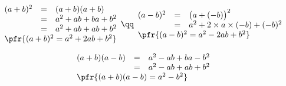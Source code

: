 \documentclass[10pt,openright,twoside,french]{book}
\begin{document}
\begin{Demo}
    \[\begin{array}[c]{rcl}
        (a + b)^2 & = & (a + b)(a + b) \\
                         & = & a^2 + ab + ba + b^2\\
                         & = & a^2 + ab + ab + b^2 \\
        \multicolumn{3}{l}{\pfr{(a + b)^2 = a^2 + 2ab + b^2}}
    \end{array} \qq
    \begin{array}[c]{rcl}
        (a - b)^2 & = & \big(a + (- b)\big)^2 \\
                        & = & a^2 + 2 \times a \times (-b) + (-b)^2\\
        \multicolumn{3}{l}{\pfr{(a - b)^2 = a^2 - 2ab + b^2}}
      \end{array}\]

    \[\begin{array}[t]{rcl}
            (a + b)(a - b) & = & a^2 - ab + ba - b^2\\
                                   & = & a^2 - ab + ab + b^2 \\
            \multicolumn{3}{l}{\pfr{(a + b)(a - b) = a^2 - b^2}}
    \end{array}\]
\end{Demo}\medskip
\end{document}
